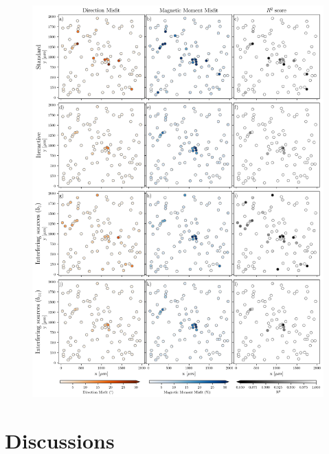 \begin{figure}[tb!]
  \centering
  \includegraphics[width=1\linewidth]{figures/inversion-comparion-2.png}
  \caption{
      }
  \label{inversion2}
\end{figure}


\section{Discussions}


